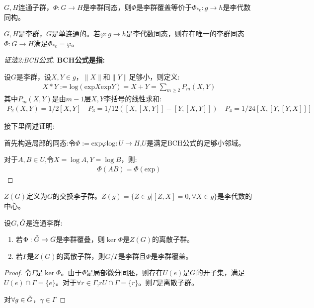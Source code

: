 \begin{example}

\end{example}
\begin{theorem}
    $G,H$连通子群，$\Phi: G \to H$是李群同态，则$\Phi$是李群覆盖等价于$\Phi_{*e}:g \to h$是李代数同构。
\end{theorem}
\begin{theorem}
    $G,H$是李群，$G$是单连通的。若$\varphi:g  \to h$是李代数同态，则存在唯一的李群同态$\Phi:G \to H$满足$\Phi_{*e}=\varphi$。
\end{theorem}
\begin{proof}[证法2:BCH公式]
    \textbf{BCH公式是指:}
    
    设$G$是李群，设$X,Y\in g$，$\|X\|$和$\|Y\|$足够小，则定义:
    \begin{align}
        X *Y:=\mathrm{log}(\mathrm{exp}X \mathrm{exp} Y)=X+Y=\sum_{m\geq 2}P_m(X,Y)
    \end{align}
    其中$P_m(X,Y)$是由$m-1$层$X,Y$李括号的线性求和:
    \begin{align}
        P_2(X,Y)=1/2[X,Y] \quad P_3=1/12([X,[X,Y]]-[Y,[X,Y]])\quad P_4=1/24 [X,[Y,[Y,X]]]
    \end{align}
     
    接下里阐述证明:

    首先构造局部的同态:令$\Phi:=\mathrm{exp}\varphi \mathrm{log}:U \to H$,$U$是满足BCH公式的足够小邻域。

    对于$A,B \in U$,令$X=\log A,Y=\log B$，则:
    \begin{align}
        \Phi(AB)=\Phi(\mathrm{exp})
    \end{align}
\end{proof}
\begin{definition}[李群中心]
    $Z(G)$定义为$G$的交换李子群。$Z(g)=\{Z \in g|[Z,X]=0,\forall X \in g\}$是李代数的中心。
\end{definition}
\begin{theorem}
    设$G,\tilde{G}$是连通李群:
    \begin{enumerate}
        \item 若$\Phi:\tilde{G}\to G$是李群覆叠，则$\ker \Phi$是$Z(G)$的离散子群。
        \item 若$\Gamma$是$Z(G)$的离散子群，则$G/\Gamma$是李群且$\Phi$是李群覆盖。
    \end{enumerate}
\end{theorem}
\begin{proof}
    令$\Gamma$是$\ker \Phi$。由于$\Phi$是局部微分同胚，则存在$U(e)$是$\tilde{G}$的开子集，满足$U(e)\cap \Gamma=\{e\}$。对于$\forall r\in \Gamma$,$rU\cap \Gamma=\{r\}$。则$\Gamma$是离散子群。

    对$\forall g \in \tilde{G}$，$\gamma \in \Gamma$
\end{proof}
